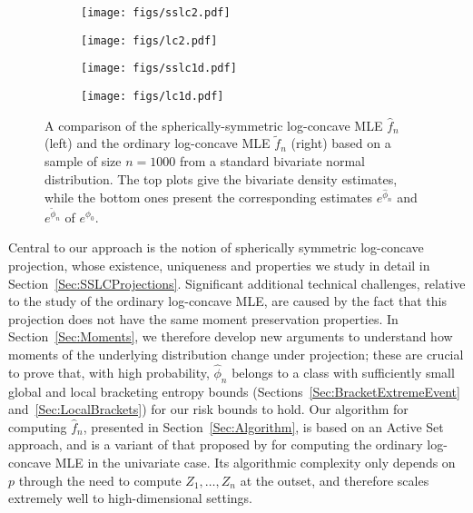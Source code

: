 \documentclass[a4paper,12pt]{article}
\begin{document}
\begin{figure}[ht!]
  \centering
  \begin{subfigure}[b]{0.4\linewidth}
    \centering
    \texttt{[image: figs/sslc2.pdf]}
  \end{subfigure}
  \begin{subfigure}[b]{0.4\linewidth}
    \centering
    \texttt{[image: figs/lc2.pdf]}
  \end{subfigure}
  \begin{subfigure}[b]{0.4\linewidth}
    \centering
    \texttt{[image: figs/sslc1d.pdf]}
  \end{subfigure}
  \begin{subfigure}[b]{0.4\linewidth}
    \centering
    \texttt{[image: figs/lc1d.pdf]}
  \end{subfigure}
\caption{\label{Fig:SSLC}A comparison of the spherically-symmetric log-concave MLE $\hat{f}_n$ (left) and the ordinary log-concave MLE $\tilde{f}_n$ (right) based on a sample of size $n=1000$ from a standard bivariate normal distribution.  The top plots give the bivariate density estimates, while the bottom ones present the corresponding estimates $e^{\hat{\phi}_n}$ and $e^{\tilde{\phi}_n}$ of $e^{\phi_0}$.}
\end{figure}

Central to our approach is the notion of spherically symmetric log-concave projection, whose existence, uniqueness and properties we study in detail in Section~\ref{Sec:SSLCProjections}.  Significant additional technical challenges, relative to the study of the ordinary log-concave MLE, are caused by the fact that this projection does not have the same moment preservation properties.  In Section~\ref{Sec:Moments}, we therefore develop new arguments to understand how moments of the underlying distribution change under projection; these are crucial to prove that, with high probability, $\hat{\phi}_n$ belongs to a class with sufficiently small global and local bracketing entropy bounds (Sections~\ref{Sec:BracketExtremeEvent} and~\ref{Sec:LocalBrackets}) for our risk bounds to hold.  Our algorithm for computing $\hat{f}_n$, presented in Section~\ref{Sec:Algorithm}, is based on an Active Set approach, and is a variant of that proposed by \citet{dumbgen2007active} for computing the ordinary log-concave MLE in the univariate case.  Its algorithmic complexity only depends on $p$ through the need to compute $Z_1,\ldots,Z_n$ at the outset, and therefore scales extremely well to high-dimensional settings.
\end{document}
